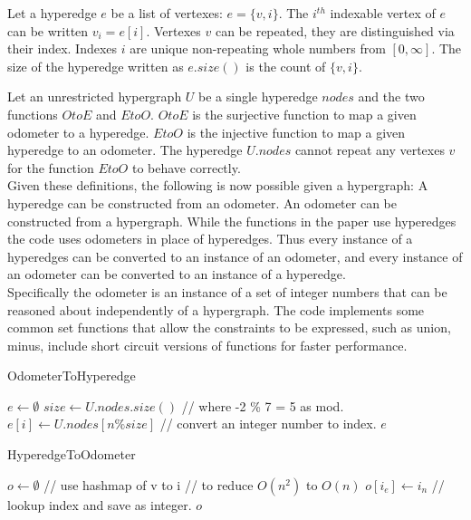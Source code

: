 Let a hyperedge $e$ be a list of vertexes: $e =\{v,i\}$. The $i^{th}$ indexable vertex of $e$ can be written $v_i = e[i]$. Vertexes $v$ can be repeated, they are distinguished via their index. Indexes $i$ are unique non-repeating whole numbers from $[0,\infty]$. The size of the hyperedge written as $e.size()$ is the count of $\{v,i\}$.


Let an unrestricted hypergraph $U$ be a single hyperedge $nodes$ and the two functions $OtoE$ and $EtoO$. $OtoE$ is the surjective function to map a given odometer to a hyperedge. $EtoO$ is the injective function to map a given hyperedge to an odometer. The hyperedge $U.nodes$ cannot repeat any vertexes $v$ for the function $EtoO$ to behave correctly. \\

Given these definitions, the following is now possible given a hypergraph: A hyperedge can be constructed from an odometer. An odometer can be constructed from a hypergraph. While the functions in the paper use hyperedges the code uses odometers in place of hyperedges. Thus every instance of a hyperedges can be converted to an instance of an odometer, and every instance of an odometer can be converted to an instance of a hyperedge.\\

Specifically the odometer is an instance of a set of integer numbers that can be reasoned about independently of a hypergraph. The code implements some common set functions that allow the constraints to be expressed, such as union, minus, include short circuit versions of functions for faster performance. 

\begin{algorithm}
	\caption{OdometerToHyperedge}\label{OtoE}
	\begin{algorithmic}[1]
		\State $e \gets \emptyset$
		\State $size \gets U.nodes.size()$
		\State // where -2 \% 7 = 5 as mod.
		\State $e[i] \gets U.nodes[ n \% size ]$ // convert an integer number to index.
		\EndFor
		\State \Return $e$
		\EndFunction
	\end{algorithmic}
\end{algorithm}
\begin{algorithm}
	\caption{HyperedgeToOdometer}\label{EtoO}
	\begin{algorithmic}[1]
		\State $o \gets \emptyset$
		  // use hashmap of v to i
		 // to reduce $O(n^2)$ to $O(n)$
		\State $o[i_e] \gets i_n$ // lookup index and save as integer.
		\EndIf
		\EndFor
		\EndFor
		\State \Return $o$
		\EndFunction
	\end{algorithmic}
\end{algorithm}

